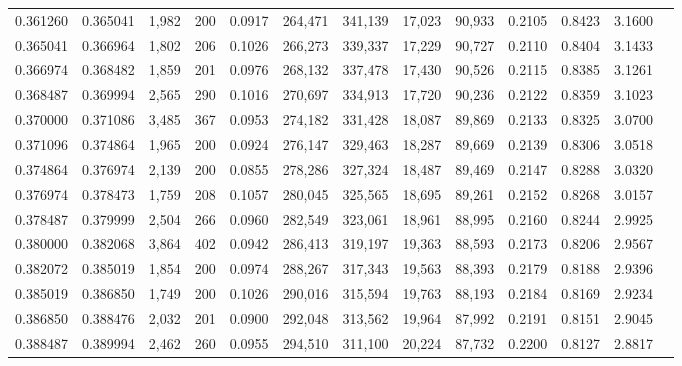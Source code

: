 \begin{tabular}{rrrrrrrrrrrrr}
0.361260 & 0.365041 & 1,982 & 200 &                                     0.0917 & 264,471 & 341,139 &  17,023 &  90,933 & 0.2105 & 0.8423 & 3.1600 \\
0.365041 & 0.366964 & 1,802 & 206 &                                     0.1026 & 266,273 & 339,337 &  17,229 &  90,727 & 0.2110 & 0.8404 & 3.1433 \\
0.366974 & 0.368482 & 1,859 & 201 &                                     0.0976 & 268,132 & 337,478 &  17,430 &  90,526 & 0.2115 & 0.8385 & 3.1261 \\
0.368487 & 0.369994 & 2,565 & 290 &                                     0.1016 & 270,697 & 334,913 &  17,720 &  90,236 & 0.2122 & 0.8359 & 3.1023 \\
0.370000 & 0.371086 & 3,485 & 367 &                                     0.0953 & 274,182 & 331,428 &  18,087 &  89,869 & 0.2133 & 0.8325 & 3.0700 \\
0.371096 & 0.374864 & 1,965 & 200 &                                     0.0924 & 276,147 & 329,463 &  18,287 &  89,669 & 0.2139 & 0.8306 & 3.0518 \\
0.374864 & 0.376974 & 2,139 & 200 &                                     0.0855 & 278,286 & 327,324 &  18,487 &  89,469 & 0.2147 & 0.8288 & 3.0320 \\
0.376974 & 0.378473 & 1,759 & 208 &                                     0.1057 & 280,045 & 325,565 &  18,695 &  89,261 & 0.2152 & 0.8268 & 3.0157 \\
0.378487 & 0.379999 & 2,504 & 266 &                                     0.0960 & 282,549 & 323,061 &  18,961 &  88,995 & 0.2160 & 0.8244 & 2.9925 \\
0.380000 & 0.382068 & 3,864 & 402 &                                     0.0942 & 286,413 & 319,197 &  19,363 &  88,593 & 0.2173 & 0.8206 & 2.9567 \\
0.382072 & 0.385019 & 1,854 & 200 &                                     0.0974 & 288,267 & 317,343 &  19,563 &  88,393 & 0.2179 & 0.8188 & 2.9396 \\
0.385019 & 0.386850 & 1,749 & 200 &                                     0.1026 & 290,016 & 315,594 &  19,763 &  88,193 & 0.2184 & 0.8169 & 2.9234 \\
0.386850 & 0.388476 & 2,032 & 201 &                                     0.0900 & 292,048 & 313,562 &  19,964 &  87,992 & 0.2191 & 0.8151 & 2.9045 \\
0.388487 & 0.389994 & 2,462 & 260 &                                     0.0955 & 294,510 & 311,100 &  20,224 &  87,732 & 0.2200 & 0.8127 & 2.8817 \\

\end{tabular}
